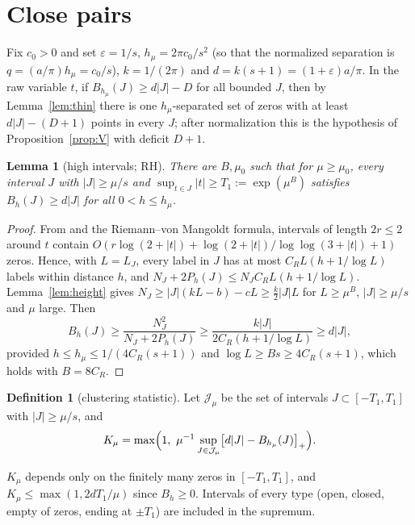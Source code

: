 \documentclass[11pt]{amsart}
\newtheorem{lemma}[proposition]{Lemma}
\theoremstyle{definition}
\newtheorem{definition}[proposition]{Definition}
\theoremstyle{remark}
\numberwithin{equation}{section}
\begin{document}
\section{Close pairs}\label{sec:pairs}

Fix $c_0>0$ and set $\varepsilon=1/s$, $h_\mu=2\pi c_0/s^2$ (so that the normalized separation is $q=(a/\pi)h_\mu=c_0/s$), $k=1/(2\pi)$ and $d=k(s+1)=(1+\varepsilon)a/\pi$. In the raw variable $t$, if $B_{h_\mu}(J)\ge d|J|-D$ for all bounded $J$, then by Lemma~\ref{lem:thin} there is one $h_\mu$-separated set of zeros with at least $d|J|-(D+1)$ points in every $J$; after normalization this is the hypothesis of Proposition~\ref{prop:V} with deficit $D+1$.

\begin{lemma}[high intervals; RH]\label{lem:high}
There are $B,\mu_0$ such that for $\mu\ge\mu_0$, every interval $J$ with $|J|\ge\mu/s$ and $\sup_{t\in J}|t|\ge T_1:=\exp(\mu^B)$ satisfies $B_{h}(J)\ge d|J|$ for all $0<h\le h_\mu$.
\end{lemma}
\begin{proof}
From \cite{CCM13} and the Riemann--von Mangoldt formula, intervals of length $2r\le2$ around $t$ contain $O(r\log(2+|t|)+\log(2+|t|)/\log\log(3+|t|)+1)$ zeros. Hence, with $L=L_J$, every label in $J$ has at most $C_RL(h+1/\log L)$ labels within distance $h$, and $N_J+2P_h(J)\le N_JC_RL(h+1/\log L)$. Lemma~\ref{lem:height} gives $N_J\ge|J|(kL-b)-cL\ge\frac k2|J|L$ for $L\ge\mu^B$, $|J|\ge\mu/s$ and $\mu$ large. Then
\[
B_h(J)\ge\frac{N_J^2}{N_J+2P_h(J)}\ge\frac{k|J|}{2C_R(h+1/\log L)}\ge d|J|,
\]
provided $h\le h_\mu\le1/(4C_R(s+1))$ and $\log L\ge Bs\ge4C_R(s+1)$, which holds with $B=8C_R$.
\end{proof}

\begin{definition}[clustering statistic]\label{def:K}
Let $\mathcal J_\mu$ be the set of intervals $J\subset[-T_1,T_1]$ with $|J|\ge\mu/s$, and
\[
K_\mu=\max\Bigl(1,\ \mu^{-1}\sup_{J\in\mathcal J_\mu}\bigl[d|J|-B_{h_\mu}(J)\bigr]_+\Bigr).
\]
\end{definition}

$K_\mu$ depends only on the finitely many zeros in $[-T_1,T_1]$, and $K_\mu\le\max(1,2dT_1/\mu)$ since $B_h\ge0$. Intervals of every type (open, closed, empty of zeros, ending at $\pm T_1$) are included in the supremum.
\end{document}
